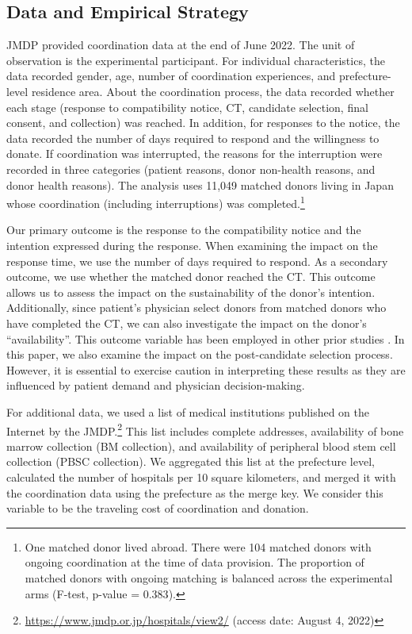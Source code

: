 \documentclass[12pt, a4paper]{article}
\begin{document}
\hypertarget{data-and-empirical-strategy}{%
\subsection{Data and Empirical Strategy}\label{data-and-empirical-strategy}}

JMDP provided coordination data at the end of June 2022. The unit of observation is the experimental participant. For individual characteristics, the data recorded gender, age, number of coordination experiences, and prefecture-level residence area. About the coordination process, the data recorded whether each stage (response to compatibility notice, CT, candidate selection, final consent, and collection) was reached. In addition, for responses to the notice, the data recorded the number of days required to respond and the willingness to donate. If coordination was interrupted, the reasons for the interruption were recorded in three categories (patient reasons, donor non-health reasons, and donor health reasons). The analysis uses 11,049 matched donors living in Japan whose coordination (including interruptions) was completed.\footnote{One matched donor lived abroad. There were 104 matched donors with ongoing coordination at the time of data provision. The proportion of matched donors with ongoing matching is balanced across the experimental arms (F-test, p-value = \(0.383\)).}

Our primary outcome is the response to the compatibility notice and the intention expressed during the response. When examining the impact on the response time, we use the number of days required to respond. As a secondary outcome, we use whether the matched donor reached the CT. This outcome allows us to assess the impact on the sustainability of the donor's intention. Additionally, since patient's physician select donors from matched donors who have completed the CT, we can also investigate the impact on the donor's ``availability''. This outcome variable has been employed in other prior studies \citep[for example,][]{Haylock2022}. In this paper, we also examine the impact on the post-candidate selection process. However, it is essential to exercise caution in interpreting these results as they are influenced by patient demand and physician decision-making.

For additional data, we used a list of medical institutions published on the Internet by the JMDP.\footnote{\url{https://www.jmdp.or.jp/hospitals/view2/} (access date: August 4, 2022)} This list includes complete addresses, availability of bone marrow collection (BM collection), and availability of peripheral blood stem cell collection (PBSC collection). We aggregated this list at the prefecture level, calculated the number of hospitals per 10 square kilometers, and merged it with the coordination data using the prefecture as the merge key. We consider this variable to be the traveling cost of coordination and donation.
\end{document}
